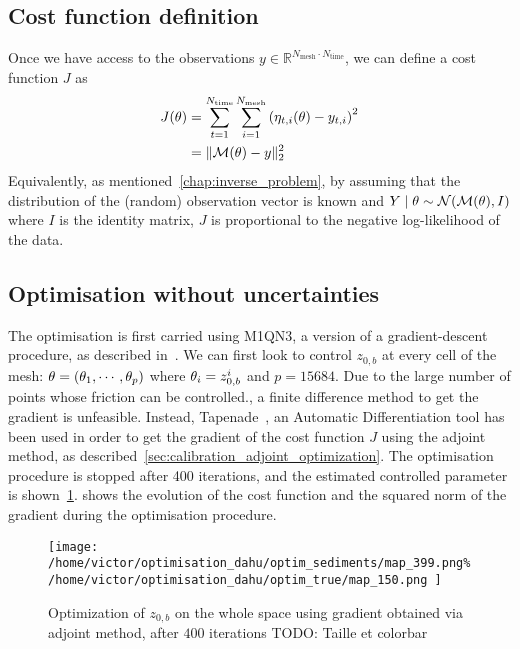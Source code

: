 \documentclass[../../Main_ManuscritThese.tex]{subfiles}
\newcommand{\zob}{z_{0,b}}
\begin{document}
\subsection{Cost function definition}
Once we have access to the observations
$y \in \mathbb{R}^{N_{\mathrm{mesh}} \cdot N_{\mathrm{time}}}$, we can define a cost function $J$ as
\begin{align}
  J(\theta) &= \sum_{t=1}^{ N_{\mathrm{time}}}\sum_{i=1}^{N_{\mathrm{mesh}}}  \left(\eta_{t,i}(\theta) - y_{t, i}\right)^2 \\
         &= \|\mathcal{M}(\theta) - y\|_2^2
\end{align}
Equivalently, as mentioned~\cref{chap:inverse_problem}, by assuming
that the distribution of the (random) observation vector is known and
$Y \mid \theta \sim \mathcal{N}(\mathcal{M}(\theta), I)$ where $I$ is the
identity matrix, $J$ is proportional to the negative log-likelihood of the data.

\subsection{Optimisation without uncertainties}
\label{ssec:optim_gradient}
The optimisation is first carried using M1QN3, a version of a
gradient-descent procedure, as described
in~\cite{gilbert_numerical_1989}. We can first look to control $\zob$
at every cell of the mesh: $\theta = (\theta_1,\cdots, \theta_p)$ where
$\kk_i = \zob^i$ and $p=\num{15684}$. Due to the large number of
points whose friction can be controlled., a finite difference method
to get the gradient is unfeasible. Instead,
Tapenade~\citep{hascoet_tapenade_2013}, an Automatic Differentiation
tool has been used in order to get the gradient of the cost function
$J$ using the adjoint method, as
described~\cref{sec:calibration_adjoint_optimization}. The
optimisation procedure is stopped after \num{400} iterations, and the
estimated controlled parameter is
shown~\cref{fig:optimization_map_399}.
 shows the
evolution of the cost function and the squared norm of the gradient
during the optimisation procedure.

 \begin{figure}[ht]
  \centering
  \texttt{[image: /home/victor/optimisation\_dahu/optim\_sediments/map\_399.png\% /home/victor/optimisation\_dahu/optim\_true/map\_150.png
  ]}
  \caption{\label{fig:optimization_map_399} Optimization of $\zob$ on
    the whole space using gradient obtained via adjoint method, after
    $400$ iterations TODO: {Taille et colorbar} }
\end{figure}
\end{document}
